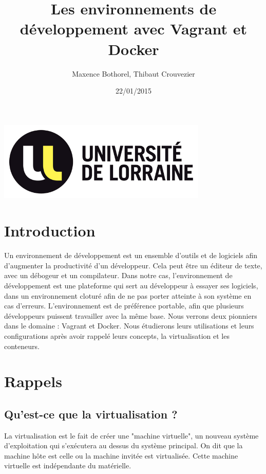 \documentclass[12pt,a4paper]{article}
\title{Les environnements de développement avec Vagrant et Docker}
\author{Maxence Bothorel, Thibaut Crouvezier}
\date{22/01/2015}
\begin{document}
\maketitle{}

\begin{center}
  \includegraphics[width=10cm]{images_rapport/univ_logo.jpg}
\end{center}

\newpage{}

\tableofcontents{}

\newpage{}

\section{Introduction}
Un environnement de développement est un ensemble d'outils et de logiciels afin d'augmenter la productivité d'un développeur. Cela peut être un éditeur de texte, avec un débogeur et un compilateur. Dans notre cas, l'environnement de développement est une plateforme qui sert au développeur à essayer ses logiciels, dans un environnement cloturé afin de ne pas porter atteinte à son système en cas d'erreurs. L'environnement est de préférence portable, afin que plusieurs développeurs puissent travailler avec la même base. Nous verrons deux pionniers dans le domaine : Vagrant et Docker. Nous étudierons leurs utilisations et leurs configurations  après avoir rappelé leurs concepts, la virtualisation et les conteneurs. 

\section{Rappels}

\subsection{Qu'est-ce que la virtualisation ?}

La virtualisation est le fait de créer une "machine virtuelle", un nouveau système d'exploitation qui s'exécutera au dessus du système principal. On dit que la machine hôte est celle ou la machine invitée est virtualisée. Cette machine virtuelle est indépendante du matérielle.
\end{document}
